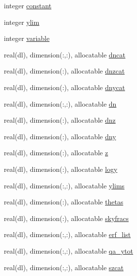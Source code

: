 \begin{DoxyCompactItemize}
\item 
integer \mbox{\hyperlink{namespaceszcounts_a9d5e47bc9753495f7e786d6a346a0430}{constant}}
\item 
integer \mbox{\hyperlink{namespaceszcounts_a2113fbfc3fd3f4f7d482dfc83ed3ce40}{ylim}}
\item 
integer \mbox{\hyperlink{namespaceszcounts_a971abc806d9e41dbb94fcf7b448b1c91}{variable}}
\item 
real(dl), dimension(\+:,\+:), allocatable \mbox{\hyperlink{namespaceszcounts_a97eccbe43cd988a15f416908d5032a54}{dncat}}
\item 
real(dl), dimension(\+:), allocatable \mbox{\hyperlink{namespaceszcounts_a7a9570e041772a0a85c72608e5bd79b8}{dnzcat}}
\item 
real(dl), dimension(\+:), allocatable \mbox{\hyperlink{namespaceszcounts_ad8ce700b221def6cc6adfbbac449cdec}{dnycat}}
\item 
real(dl), dimension(\+:,\+:), allocatable \mbox{\hyperlink{namespaceszcounts_a169b8a0331217f4777d810a37e5459c2}{dn}}
\item 
real(dl), dimension(\+:), allocatable \mbox{\hyperlink{namespaceszcounts_aa90e9286036783e86cde085a3266838c}{dnz}}
\item 
real(dl), dimension(\+:), allocatable \mbox{\hyperlink{namespaceszcounts_aed7311f56ea05af971cdd62ed4d8ff1c}{dny}}
\item 
real(dl), dimension(\+:), allocatable \mbox{\hyperlink{namespaceszcounts_a1bde530b627f5318a6681ddc544355d6}{z}}
\item 
real(dl), dimension(\+:), allocatable \mbox{\hyperlink{namespaceszcounts_a42ba2df42e9722f2624e5f3e187731c3}{logy}}
\item 
real(dl), dimension(\+:,\+:), allocatable \mbox{\hyperlink{namespaceszcounts_a237475f3cddb3344fb45713300e0fe94}{ylims}}
\item 
real(dl), dimension(\+:), allocatable \mbox{\hyperlink{namespaceszcounts_a5717e85376dd2fd0bb2bb0eb6fb9e7fb}{thetas}}
\item 
real(dl), dimension(\+:), allocatable \mbox{\hyperlink{namespaceszcounts_aae1d8f46899dd92909f27129c9866db5}{skyfracs}}
\item 
real(dl), dimension(\+:,\+:), allocatable \mbox{\hyperlink{namespaceszcounts_abc9374ee47357a4c1c760d45a0336faf}{erf\+\_\+list}}
\item 
real(dl), dimension(\+:,\+:), allocatable \mbox{\hyperlink{namespaceszcounts_a4aebae61d9611765edf7687fe66c383d}{qa\+\_\+ytot}}
\item 
real(dl), dimension(\+:,\+:), allocatable \mbox{\hyperlink{namespaceszcounts_addcf659f211cb953c4ed1510888bc24a}{szcat}}

\end{DoxyCompactItemize}
